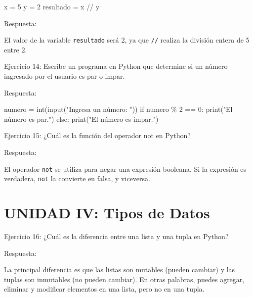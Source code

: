 \documentclass[
  a4paper,
  DIV=11,
  numbers=noendperiod,
  onepage,
  openany]{scrreprt}
\newenvironment{Shaded}{\begin{snugshade}}{\end{snugshade}}
\newcommand{\BuiltInTok}[1]{\textcolor[rgb]{0.00,0.23,0.31}{#1}}
\newcommand{\ControlFlowTok}[1]{\textcolor[rgb]{0.00,0.23,0.31}{#1}}
\newcommand{\DecValTok}[1]{\textcolor[rgb]{0.68,0.00,0.00}{#1}}
\newcommand{\NormalTok}[1]{\textcolor[rgb]{0.00,0.23,0.31}{#1}}
\newcommand{\OperatorTok}[1]{\textcolor[rgb]{0.37,0.37,0.37}{#1}}
\newcommand{\StringTok}[1]{\textcolor[rgb]{0.13,0.47,0.30}{#1}}
\begin{document}
\begin{Shaded}
\begin{Highlighting}[]
\NormalTok{x }\OperatorTok{=} \DecValTok{5}
\NormalTok{y }\OperatorTok{=} \DecValTok{2}
\NormalTok{resultado }\OperatorTok{=}\NormalTok{ x }\OperatorTok{//}\NormalTok{ y}
\end{Highlighting}
\end{Shaded}

Respuesta:

El valor de la variable \texttt{resultado} será 2, ya que \texttt{//}
realiza la división entera de 5 entre 2.

Ejercicio 14: Escribe un programa en Python que determine si un número
ingresado por el usuario es par o impar.

Respuesta:

\begin{Shaded}
\begin{Highlighting}[]
\NormalTok{numero }\OperatorTok{=} \BuiltInTok{int}\NormalTok{(}\BuiltInTok{input}\NormalTok{(}\StringTok{"Ingresa un número: "}\NormalTok{))}
\ControlFlowTok{if}\NormalTok{ numero }\OperatorTok{\%} \DecValTok{2} \OperatorTok{==} \DecValTok{0}\NormalTok{:}
    \BuiltInTok{print}\NormalTok{(}\StringTok{"El número es par."}\NormalTok{)}
\ControlFlowTok{else}\NormalTok{:}
    \BuiltInTok{print}\NormalTok{(}\StringTok{"El número es impar."}\NormalTok{)}
\end{Highlighting}
\end{Shaded}

Ejercicio 15: ¿Cuál es la función del operador not en Python?

Respuesta:

El operador \texttt{not} se utiliza para negar una expresión booleana.
Si la expresión es verdadera, \texttt{not} la convierte en falsa, y
viceversa.

\hypertarget{unidad-iv-tipos-de-datos}{%
\section{UNIDAD IV: Tipos de Datos}\label{unidad-iv-tipos-de-datos}}

Ejercicio 16: ¿Cuál es la diferencia entre una lista y una tupla en
Python?

Respuesta:

La principal diferencia es que las listas son mutables (pueden cambiar)
y las tuplas son inmutables (no pueden cambiar). En otras palabras,
puedes agregar, eliminar y modificar elementos en una lista, pero no en
una tupla.
\end{document}
